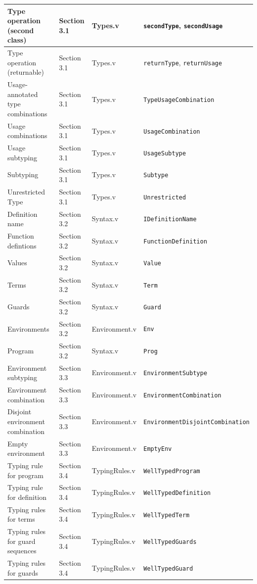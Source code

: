 \begin{tabularx}{\textwidth}{|L|l|l|l|}
    Type operation (second class) & Section 3.1 & Types.v & \lstinline|secondType|, \lstinline|secondUsage| \\ \hline
    Type operation (returnable) & Section 3.1 & Types.v & \lstinline|returnType|, \lstinline|returnUsage| \\ \hline
    Usage-annotated type combinations & Section 3.1 & Types.v & \lstinline|TypeUsageCombination| \\ \hline
    Usage combinations & Section 3.1 & Types.v & \lstinline|UsageCombination| \\ \hline
    Usage subtyping & Section 3.1 & Types.v & \lstinline|UsageSubtype| \\ \hline
    Subtyping & Section 3.1 & Types.v & \lstinline|Subtype| \\ \hline
    Unrestricted Type & Section 3.1 & Types.v & \lstinline|Unrestricted| \\ \hline
    Definition name & Section 3.2 & Syntax.v & \lstinline|IDefinitionName| \\ \hline
    Function defintions & Section 3.2 & Syntax.v & \lstinline|FunctionDefinition| \\ \hline
    Values & Section 3.2 & Syntax.v & \lstinline|Value| \\ \hline
    Terms & Section 3.2 & Syntax.v & \lstinline|Term| \\ \hline
    Guards & Section 3.2 & Syntax.v & \lstinline|Guard| \\ \hline
    Environments & Section 3.2 & Environment.v & \lstinline|Env| \\ \hline
    Program & Section 3.2 & Syntax.v & \lstinline|Prog| \\ \hline
    Environment subtyping & Section 3.3 & Environment.v & \lstinline|EnvironmentSubtype| \\ \hline
    Environment combination & Section 3.3 & Environment.v & \lstinline|EnvironmentCombination| \\ \hline
    Disjoint environment combination & Section 3.3 & Environment.v & \lstinline|EnvironmentDisjointCombination| \\ \hline
    Empty environment & Section 3.3 & Environment.v & \lstinline|EmptyEnv| \\ \hline
    Typing rule for program & Section 3.4 & TypingRules.v & \lstinline|WellTypedProgram| \\ \hline
    Typing rule for definition & Section 3.4 & TypingRules.v & \lstinline|WellTypedDefinition| \\ \hline
    Typing rules for terms & Section 3.4 & TypingRules.v & \lstinline|WellTypedTerm| \\ \hline
    Typing rules for guard sequences & Section 3.4 & TypingRules.v & \lstinline|WellTypedGuards| \\ \hline
    Typing rules for guards & Section 3.4 & TypingRules.v & \lstinline|WellTypedGuard| \\ \hline
\end{tabularx}


